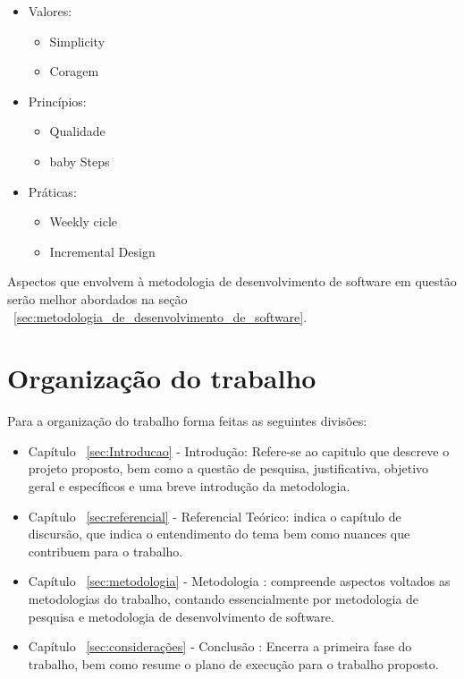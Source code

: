 \begin{itemize}
   \item Valores:
   \begin{itemize}
       \item Simplicity
       \item Coragem
    \end{itemize}
    \item Princípios:
    \begin{itemize}
       \item Qualidade
       \item baby Steps
    \end{itemize}
    \item Práticas:
    \begin{itemize}
       \item Weekly cicle
       \item Incremental Design
    \end{itemize}
\end{itemize}

 
Aspectos que envolvem à metodologia de desenvolvimento de software em questão serão melhor abordados na seção ~\ref{sec:metodologia_de_desenvolvimento_de_software}.

\section{Organização do trabalho}

Para a organização do trabalho forma feitas as seguintes divisões:

\begin{itemize}
   \item Capítulo ~\ref{sec:Introducao} - Introdução: Refere-se ao capitulo que descreve o projeto proposto, bem como a questão de pesquisa, justificativa, objetivo geral e específicos e uma breve introdução da metodologia.
   \item Capítulo ~\ref{sec:referencial} - Referencial Teórico: indica o capítulo de  discursão, que indica o entendimento do tema bem como nuances que contribuem para o trabalho.
   \item Capítulo ~\ref{sec:metodologia} - Metodologia : compreende aspectos voltados as metodologias do trabalho, contando essencialmente por metodologia de pesquisa e metodologia de desenvolvimento de software.
   \item Capítulo ~\ref{sec:considerações} - Conclusão : Encerra a primeira fase do trabalho, bem como resume o plano de execução para o trabalho proposto.
\end{itemize}